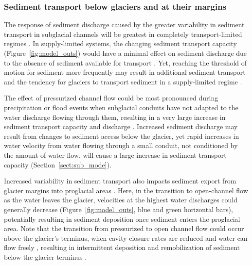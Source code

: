 \documentclass[11pt]{article}
\begin{document}
\begin{spacing}{1}
          \subsubsection{Sediment transport below glaciers and at their margins}
        
          The response of sediment discharge caused by the greater variability in sediment transport in subglacial channels will be greatest in completely transport-limited regimes \citep[e.g.][]{kasmalkar2019}.
          In supply-limited systems, the changing sediment transport capacity (Figure~\ref{fig:model_outs}) would have a minimal effect on sediment discharge due to the absence of sediment available for transport \citep{delaney2019}.
          Yet, reaching the threshold of motion for sediment more frequently may result in additional sediment transport and the tendency for glaciers to transport sediment in a supply-limited regime \citep[e.g.][]{herman2015}.
        
          The effect of pressurized channel flow could be most pronounced during precipitation or flood events when subglacial conduits have not adapted to the water discharge flowing through them, resulting in a very large increase in sediment transport capacity and discharge \citep[e.g.][]{cowan1988,delaney2019}.
         Increased sediment discharge may result from changes to sediment access below the glacier, yet rapid increases in water velocity from water flowing through a small conduit, not conditioned by the amount of water flow, will cause a large increase in sediment transport capacity (Section~\ref{sect:sub_mode}).
          
          Increased variability in sediment transport also impacts sediment export from glacier margins into proglacial areas \citep[e.g.][]{delaney2017,perolo2018}.
          Here, in the transition to open-channel flow as the water leaves the glacier, velocities at the highest water discharges could generally decrease (Figure~\ref{fig:model_outs}, blue and green horizontal bars), potentially resulting in sediment deposition once sediment enters the proglacial area.
         Note that the transition from pressurized to open channel flow could occur above the glacier's terminus, when cavity closure rates are reduced and water can flow freely \citep{egli2021b}, resulting in intermittent deposition and remobilization of sediment below the glacier terminus \citep{perolo2018}.
          

\end{spacing}
\end{document}
